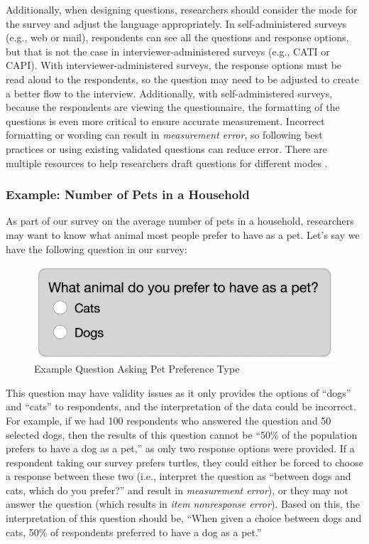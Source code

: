 \documentclass[
]{krantz}
\begin{document}
Additionally, when designing questions, researchers should consider the mode for the survey and adjust the language appropriately. In self-administered surveys (e.g., web or mail), respondents can see all the questions and response options, but that is not the case in interviewer-administered surveys (e.g., CATI or CAPI). With interviewer-administered surveys, the response options must be read aloud to the respondents, so the question may need to be adjusted to create a better flow to the interview. Additionally, with self-administered surveys, because the respondents are viewing the questionnaire, the formatting of the questions is even more critical to ensure accurate measurement. Incorrect formatting or wording can result in \emph{measurement error}, so following best practices or using existing validated questions can reduce error. There are multiple resources to help researchers draft questions for different modes \citep[e.g.,][]{dillman2014mode, Fowler1989, Bradburn2004, Tourangeau2004spacing}.

\hypertarget{overview-design-questionnaire-ex}{%
\subsubsection*{Example: Number of Pets in a Household}\label{overview-design-questionnaire-ex}}


As part of our survey on the average number of pets in a household, researchers may want to know what animal most people prefer to have as a pet. Let's say we have the following question in our survey:

\begin{figure}

{\centering \includegraphics[width=0.7\linewidth]{images/PetExample1} 

}

\caption{Example Question Asking Pet Preference Type}\label{fig:overview-pet-examp1}
\end{figure}

This question may have validity issues as it only provides the options of ``dogs'' and ``cats'' to respondents, and the interpretation of the data could be incorrect. For example, if we had 100 respondents who answered the question and 50 selected dogs, then the results of this question cannot be ``50\% of the population prefers to have a dog as a pet,'' as only two response options were provided. If a respondent taking our survey prefers turtles, they could either be forced to choose a response between these two (i.e., interpret the question as ``between dogs and cats, which do you prefer?'' and result in \emph{measurement error}), or they may not answer the question (which results in \emph{item nonresponse error}). Based on this, the interpretation of this question should be, ``When given a choice between dogs and cats, 50\% of respondents preferred to have a dog as a pet.''
\end{document}
